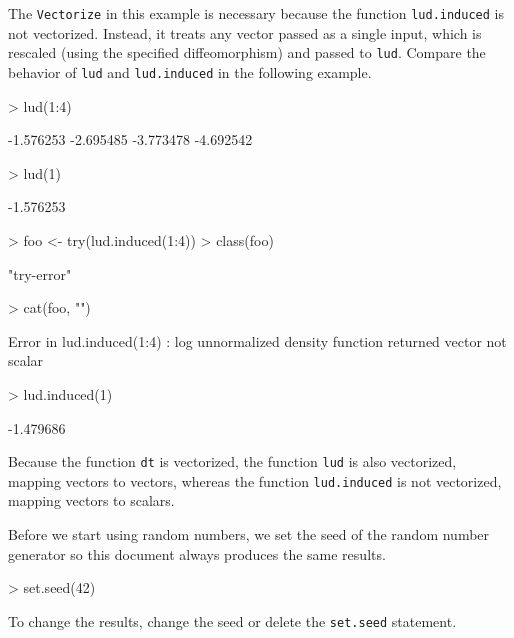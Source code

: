 \documentclass{article}
\begin{document}
The \texttt{Vectorize} in this example is necessary because
the function \texttt{lud.induced} is not vectorized.
Instead, it treats any vector passed as a single input, which
is rescaled (using the specified diffeomorphism) and passed to
\texttt{lud}.  Compare the behavior of \texttt{lud} and
\texttt{lud.induced} in the following example.
\begin{Schunk}
\begin{Sinput}
> lud(1:4)
\end{Sinput}
\begin{Soutput}
[1] -1.576253 -2.695485 -3.773478 -4.692542
\end{Soutput}
\begin{Sinput}
> lud(1)
\end{Sinput}
\begin{Soutput}
[1] -1.576253
\end{Soutput}
\begin{Sinput}
> foo <- try(lud.induced(1:4))
> class(foo)
\end{Sinput}
\begin{Soutput}
[1] "try-error"
\end{Soutput}
\begin{Sinput}
> cat(foo, "\n")
\end{Sinput}
\begin{Soutput}
Error in lud.induced(1:4) : 
  log unnormalized density function returned vector not scalar
\end{Soutput}
\begin{Sinput}
> lud.induced(1)
\end{Sinput}
\begin{Soutput}
[1] -1.479686
\end{Soutput}
\end{Schunk}
Because the function \texttt{dt} is vectorized, the function \texttt{lud}
is also vectorized, mapping vectors to vectors,
whereas the function \texttt{lud.induced} is not vectorized,
mapping vectors to scalars.

Before we start using random numbers, we set the seed of the random number
generator so this document always produces the same results.
\begin{Schunk}
\begin{Sinput}
> set.seed(42)
\end{Sinput}
\end{Schunk}
To change the results, change the seed or delete the \texttt{set.seed}
statement.
\end{document}
